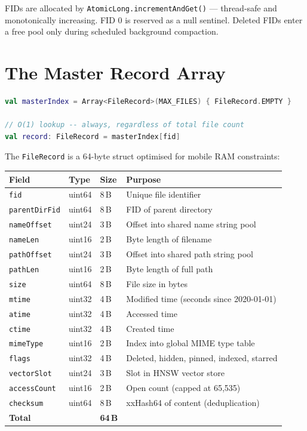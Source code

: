 FIDs are allocated by \texttt{AtomicLong.incrementAndGet()} --- thread-safe and monotonically increasing. FID 0 is reserved as a null sentinel. Deleted FIDs enter a free pool only during scheduled background compaction.

\section{The Master Record Array}

\begin{lstlisting}[language=Kotlin, caption=Master Record Array]
val masterIndex = Array<FileRecord>(MAX_FILES) { FileRecord.EMPTY }

// O(1) lookup -- always, regardless of total file count
val record: FileRecord = masterIndex[fid]
\end{lstlisting}

The \texttt{FileRecord} is a 64-byte struct optimised for mobile RAM constraints:

\begin{longtable}{@{}p{30mm}p{20mm}p{12mm}p{68mm}@{}}
\toprule
\textbf{Field} & \textbf{Type} & \textbf{Size} & \textbf{Purpose} \\
\midrule
\texttt{fid} & uint64 & 8\,B & Unique file identifier \\
\texttt{parentDirFid} & uint64 & 8\,B & FID of parent directory \\
\texttt{nameOffset} & uint24 & 3\,B & Offset into shared name string pool \\
\texttt{nameLen} & uint16 & 2\,B & Byte length of filename \\
\texttt{pathOffset} & uint24 & 3\,B & Offset into shared path string pool \\
\texttt{pathLen} & uint16 & 2\,B & Byte length of full path \\
\texttt{size} & uint64 & 8\,B & File size in bytes \\
\texttt{mtime} & uint32 & 4\,B & Modified time (seconds since 2020-01-01) \\
\texttt{atime} & uint32 & 4\,B & Accessed time \\
\texttt{ctime} & uint32 & 4\,B & Created time \\
\texttt{mimeType} & uint16 & 2\,B & Index into global MIME type table \\
\texttt{flags} & uint32 & 4\,B & Deleted, hidden, pinned, indexed, starred \\
\texttt{vectorSlot} & uint24 & 3\,B & Slot in HNSW vector store \\
\texttt{accessCount} & uint16 & 2\,B & Open count (capped at 65,535) \\
\texttt{checksum} & uint64 & 8\,B & xxHash64 of content (deduplication) \\
\midrule
\textbf{Total} & & \textbf{64\,B} & \\
\bottomrule
\end{longtable}

